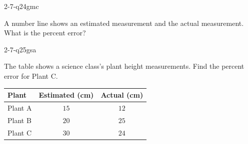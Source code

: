 \begin{practiceQuestion}{2-7-q24}{gmc}
\begin{questionText}
A number line shows an estimated measurement and the actual measurement. What is the percent error?

\begin{center}
\end{center}
\end{questionText}
\end{practiceQuestion}

\begin{practiceQuestion}{2-7-q25}{gsa}
\begin{questionText}
The table shows a science class's plant height measurements. Find the percent error for Plant C.

\begin{center}
\begin{tabular}{|l|c|c|}
\hline
\textbf{Plant} & \textbf{Estimated (cm)} & \textbf{Actual (cm)} \\
\hline
Plant A & $15$ & $12$ \\
\hline
Plant B & $20$ & $25$ \\
\hline
Plant C & $30$ & $24$ \\
\hline
\end{tabular}
\end{center}
\end{questionText}
\end{practiceQuestion}

